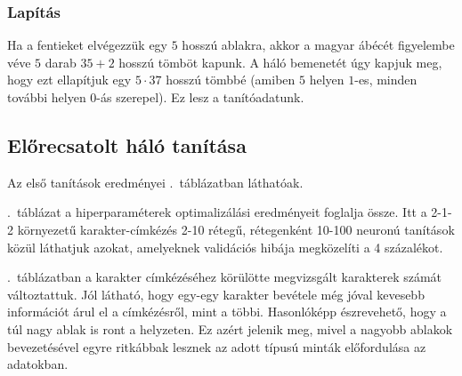 \documentclass[a4paper, magyar]{article}
\begin{document}
\subsubsection{Lapítás}

Ha a fentieket elvégezzük egy $5$ hosszú ablakra, akkor a magyar ábécét figyelembe véve $5$ darab $35+2$ hosszú tömböt kapunk. A háló bemenetét úgy kapjuk meg, hogy ezt ellapítjuk egy $5\cdot37$ hosszú tömbbé (amiben $5$ helyen $1$-es, minden további helyen $0$-ás szerepel). Ez lesz a tanítóadatunk.
\subsection{Előrecsatolt háló tanítása}
Az első tanítások eredményei .~táblázatban láthatóak.

.~táblázat a hiperparaméterek optimalizálási eredményeit foglalja össze. Itt a 2-1-2 környezetű karakter-címkézés 2-10 rétegű, rétegenként 10-100 neuronú tanítások közül láthatjuk azokat, amelyeknek validációs hibája megközelíti a 4 százalékot.

.~táblázatban a karakter címkézéséhez körülötte megvizsgált karakterek számát változtattuk. Jól látható, hogy egy-egy karakter bevétele még jóval kevesebb információt árul el a címkézésről, mint a többi. Hasonlóképp észrevehető, hogy a túl nagy ablak is ront a helyzeten. Ez azért jelenik meg, mivel a nagyobb ablakok bevezetésével egyre ritkábbak lesznek az adott típusú minták előfordulása az adatokban.
\end{document}
